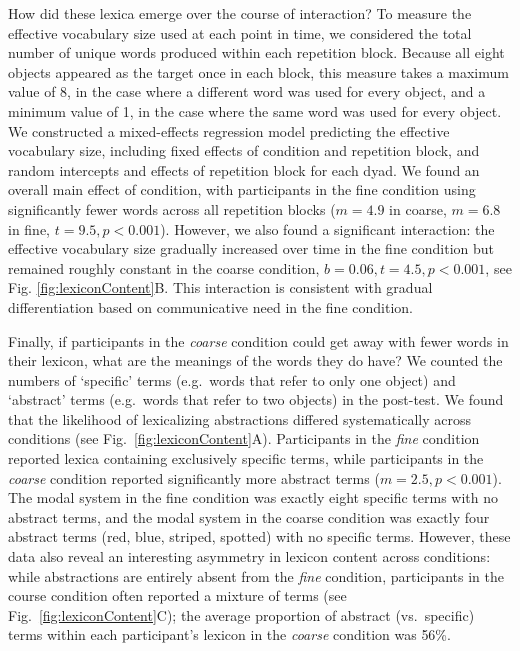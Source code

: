 How did these lexica emerge over the course of interaction? 
To measure the effective vocabulary size used at each point in time, we considered the total number of unique words produced within each repetition block.
Because all eight objects appeared as the target once in each block, this measure takes a maximum value of 8, in the case where a different word was used for every object, and a minimum value of 1, in the case where the same word was used for every object.
We constructed a mixed-effects regression model predicting the effective vocabulary size, including fixed effects of condition and repetition block, and random intercepts and effects of repetition block for each dyad. 
We found an overall main effect of condition, with participants in the fine condition using significantly fewer words across all repetition blocks ($m = 4.9$ in coarse, $m=6.8$ in fine, $t = 9.5, p < 0.001$).
However, we also found a significant interaction: the effective vocabulary size gradually increased over time in the fine condition but remained roughly constant in the coarse condition, $b = 0.06, t = 4.5, p < 0.001$, see Fig. \ref{fig:lexiconContent}B.
This interaction is consistent with gradual differentiation based on communicative need in the fine condition.

Finally, if participants in the \emph{coarse} condition could get away with fewer words in their lexicon, what are the meanings of the words they do have? 
We counted the numbers of `specific' terms (e.g.\ words that refer to only one object) and `abstract' terms (e.g.\ words that refer to two objects) in the post-test. 
We found that the likelihood of lexicalizing abstractions differed systematically across conditions (see Fig.\ \ref{fig:lexiconContent}A). 
Participants in the \emph{fine} condition reported lexica containing exclusively specific terms, while participants in the \emph{coarse} condition reported significantly more abstract terms ($m = 2.5, p < 0.001$). 
The modal system in the fine condition was exactly eight specific terms with no abstract terms, and the modal system in the coarse condition was exactly four abstract terms (red, blue, striped, spotted) with no specific terms.
However, these data also reveal an interesting asymmetry in lexicon content across conditions: while abstractions are entirely absent from the \emph{fine} condition, participants in the course condition often reported a mixture of terms (see Fig.\ \ref{fig:lexiconContent}C); the average proportion of abstract (vs.\ specific) terms within each participant's lexicon in the \emph{coarse} condition was 56\%. 

